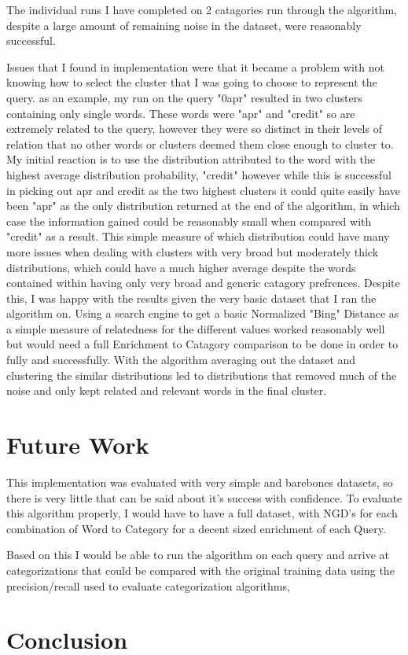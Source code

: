 \documentclass[letterpaper]{article}
\begin{document}
The individual runs I have completed on 2 catagories run through the algorithm, despite a large amount of remaining noise in the dataset, were reasonably successful.

Issues that I found in implementation were that it became a problem with not knowing how to select the cluster that I was going to choose to represent the query.
as an example, my run on the query "0apr" resulted in two clusters containing only single words. These words were "apr" and "credit" so are extremely related
to the query, however they were so distinct in their levels of relation that no other words or clusters deemed them close enough to cluster to. My initial reaction
is to use the distribution attributed to the word with the highest average distribution probability, "credit" however while this is successful in picking out apr and credit
as the two highest clusters it could quite easily have been "apr" as the only distribution returned at the end of the algorithm, in which case the information gained could be reasonably small
when compared with "credit" as a result. 
This simple measure of which distribution could have many more issues when dealing with clusters with very broad but moderately thick distributions, which could have a much higher average despite
the words contained within having only very broad and generic catagory prefrences. 
Despite this, I was happy with the results given the very basic dataset that I ran the
algorithm on. Using a search engine to get a basic Normalized "Bing" Distance as a simple measure of relatedness for the different values worked reasonably well
but would need a full Enrichment to Catagory comparison to be done in order to fully and successfully.
With the algorithm averaging out the dataset and clustering the similar distributions led to distributions that removed much of the noise and only kept related and relevant words
in the final cluster. 

\section{Future Work}

This implementation was evaluated with very simple and barebones datasets, so there is very little that
can be said about it's success with confidence. To evaluate this algorithm properly, I would have to have
a full dataset, with NGD's for each combination of Word to Category for a decent sized enrichment of each Query.

Based on this I would be able to run the algorithm on each query and arrive at categorizations that could be compared
with the original training data using the precision/recall used to evaluate categorization algorithms,


\section{Conclusion}


%
%
\end{document}
